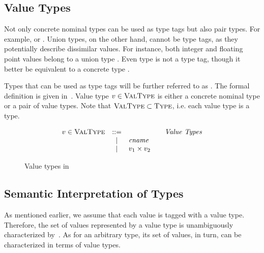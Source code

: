 \subsection{Value Types}

Not only concrete nominal types can be used as type tags
but also pair types. For example, \typair{\tyint}{\tyint}
or \typair{\tystr}{(\typair{\tyint}{\tyint})}.
Union types, on the other hand, cannot be type tags, 
as they potentially describe dissimilar values.
For instance, both integer and floating point values belong
to a union type \tyunion{\tyint}{\tyflt}.
Even type \tyunion{\tyint}{\tyint} is not a type tag, 
though it better be equivalent to a concrete type \tyint.

Types that can be used as type tags will be further referred to
as . 
The formal definition is given in~.
Value type $v \in \textsc{ValType}$ is either a concrete nominal type 
or a pair of value types. 
Note that $\textsc{ValType} \subset \textsc{Type}$, i.e. each value type is a type.

\begin{figure}
	\[
	\begin{array}{rcl@{\qquad}l}
	\vty \in \VType & ::= & & \text{\emph{Value Types}}
	\\ &\Alt& \cname & 
	\\ &\Alt& \typair{\vty_1}{\vty_2} & 
	\end{array}
	\]
	\caption{Value types in \BetaJulia}
	\label{fig:bjsem-value-types}
\end{figure}


\subsection{Semantic Interpretation of Types}

As mentioned earlier, we assume that each value is tagged with a value type.
Therefore, the set of values represented by a value type \vty
is unambiguously characterized by~\vty.
As for an arbitrary type, its set of values, in turn, can be characterized
in terms of value types.

